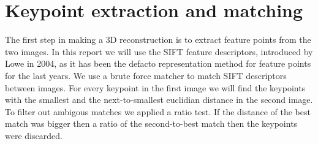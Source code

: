 \section{Keypoint extraction and matching}
\label{matching}
The first step in making a 3D reconstruction is to extract feature points from the two images. 
In this report we will use the SIFT feature descriptors, introduced by Lowe\cite{SIFT} in 2004, as it has been the defacto representation method for feature points for the last years.
We use a brute force matcher to match SIFT descriptors between images. 
For every keypoint in the first image we will find the keypoints with the smallest and the next-to-smallest euclidian distance in the second image. 
To filter out ambigous matches we applied a ratio test. If the distance of the best match was bigger then a ratio of the second-to-best match then the keypoints were discarded. 


